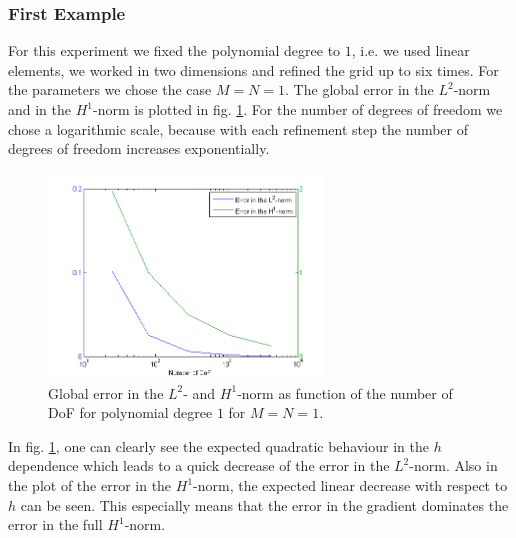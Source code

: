 \documentclass[a4paper, 11pt, twoside]{article}
\begin{document}
\subsubsection{First Example}
For this experiment we fixed the polynomial degree to $1$, i.e. we used linear elements, we worked in two dimensions and refined the grid up to six times. For the parameters we chose the case $M=N=1$. The global error in the $L^2$-norm and in the $H^1$-norm is plotted in fig. \ref{error_DOF_example1}. For the number of degrees of freedom we chose a logarithmic scale, because with each refinement step the number of degrees of freedom increases exponentially. \\
\begin{figure}[htb]
  \centering      
  \includegraphics[width=0.65\textwidth]{fig/errorf1.png}
\caption{Global error in the $L^2$- and $H^1$-norm as function of the number of DoF for polynomial degree $1$ for $M = N = 1$.}
\label{error_DOF_example1}
\end{figure}
In fig. \ref{error_DOF_example1}, one can clearly see the expected quadratic behaviour in the $h$ dependence which leads to a quick decrease of the error in the $L^2$-norm. Also in the plot of the error in the $H^1$-norm, the expected linear decrease with respect to $h$ can be seen. This especially means that the error in the gradient dominates the error in the full $H^1$-norm.
\end{document}
